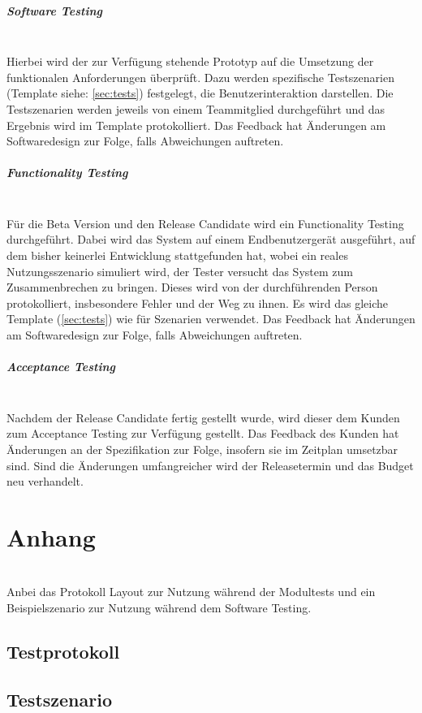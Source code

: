 \documentclass[10pt,a4paper]{article}
\begin{document}
\subparagraph{Software Testing}\ \\
Hierbei wird der zur Verfügung stehende Prototyp auf die Umsetzung der funktionalen Anforderungen überprüft. Dazu werden spezifische Testszenarien (Template siehe: \autoref{sec:tests}) festgelegt, die Benutzerinteraktion darstellen. Die Testszenarien werden jeweils von einem Teammitglied durchgeführt und das Ergebnis wird im Template protokolliert. Das Feedback hat Änderungen am Softwaredesign zur Folge, falls Abweichungen auftreten.

\subparagraph{Functionality Testing}\ \\
Für die Beta Version und den Release Candidate wird ein Functionality Testing durchgeführt. Dabei wird das System auf einem Endbenutzergerät ausgeführt, auf dem bisher keinerlei Entwicklung stattgefunden hat, wobei ein reales Nutzungsszenario simuliert wird, der Tester versucht das System zum Zusammenbrechen zu bringen. Dieses wird von der durchführenden Person protokolliert, insbesondere Fehler und der Weg zu ihnen. Es wird das gleiche Template (\autoref{sec:tests}) wie für Szenarien verwendet. Das Feedback hat Änderungen am Softwaredesign zur Folge, falls Abweichungen auftreten.

\subparagraph{Acceptance Testing}\ \\
Nachdem der Release Candidate fertig gestellt wurde, wird dieser dem Kunden zum Acceptance Testing zur Verfügung gestellt. Das Feedback des Kunden hat Änderungen an der Spezifikation zur Folge, insofern sie im Zeitplan umsetzbar sind. Sind die Änderungen umfangreicher wird der Releasetermin und das Budget neu verhandelt.

\section{Anhang} \ \\

Anbei das Protokoll Layout zur Nutzung während der Modultests und ein Beispielszenario zur Nutzung während dem Software Testing.
\newpage
\subsection{Testprotokoll}
\label{sec:testp}

\newpage
\subsection{Testszenario}
\label{sec:tests}

\end{document}
